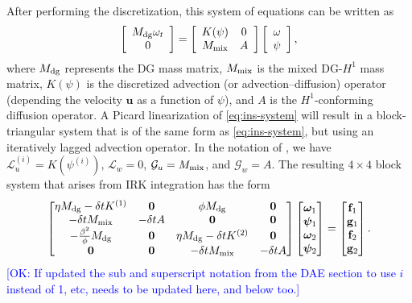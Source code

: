 \documentclass[review]{siamart}
\newcommand{\OK}[1]{\textcolor{blue}{[OK: #1]}}
\begin{document}
After performing the discretization, this system of equations can be written as
\begin{equation}
	\label{eq:ins-system}
	\left[ \begin{array}{c} M_{\rm dg} \omega_t \\ 0 \end{array} \right]
	=
	\left[ \begin{array}{cc} K(\psi) & 0 \\ M_{\rm mix} & A \end{array} \right]
	\left[ \begin{array}{c} \omega \\ \psi \end{array} \right],
\end{equation}
where $M_{\rm dg}$ represents the DG mass matrix, $M_{\rm mix}$ is the mixed DG-$H^1$ mass matrix, $K(\psi)$ is the discretized advection (or advection--diffusion) operator (depending the velocity $\bm u$ as a function of $\psi$), and $A$ is the $H^1$-conforming diffusion operator.
A Picard linearization of \eqref{eq:ins-system} will result in a block-triangular system that is of the same form as \eqref{eq:ins-system}, but using an iteratively lagged advection operator.
In the notation of , we have $\mathcal{L}_u^{(i)} = K(\psi^{(i)})$, $\mathcal{L}_w = 0$, $\mathcal{G}_u = M_{\rm mix}$, and $\mathcal{G}_w = A$.
The resulting $4\times4$ block system that arises from IRK integration has the form
\begin{align} \label{eq:vsf-system-1}
	\begin{bmatrix}
		\eta M_{\rm dg} - \delta t K^{(1)} & \mathbf{0} & \phi M_{\rm dg} & \mathbf{0} \\
		-\delta t M_{\rm mix} & -\delta t A & \mathbf{0} & \mathbf{0} \\
		-\tfrac{\beta^2}{\phi}M_{\rm dg} & \mathbf{0} & \eta M_{\rm dg} - \delta t K^{(2)} & \mathbf{0} \\
		\mathbf{0} & \mathbf{0} & -\delta t M_{\rm mix} & -\delta t A
	\end{bmatrix}
	\begin{bmatrix} \bm\omega_1 \\ \bm\psi_1 \\ \bm\omega_2 \\ \bm\psi_2 \end{bmatrix}
	=
	\begin{bmatrix} \mathbf{f}_1 \\ \mathbf{g}_1 \\ \mathbf{f}_2 \\ \mathbf{g}_2 \end{bmatrix}.
\end{align}
\OK{If updated the sub and superscript notation from the DAE section to use $i$ instead of 1, etc, needs to be updated here, and below too.}
\end{document}

